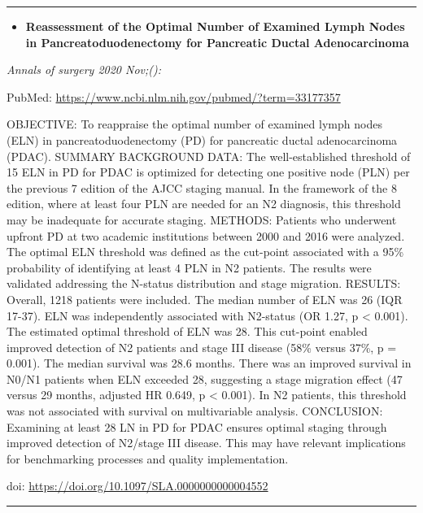 \documentclass[
]{article}
\providecommand{\tightlist}{%
  \setlength{\itemsep}{0pt}\setlength{\parskip}{0pt}}
\begin{document}
\begin{center}\rule{0.5\linewidth}{0.5pt}\end{center}

\begin{itemize}
\tightlist
\item
  \textbf{Reassessment of the Optimal Number of Examined Lymph Nodes in
  Pancreatoduodenectomy for Pancreatic Ductal Adenocarcinoma}
\end{itemize}

\emph{Annals of surgery 2020 Nov;():}

PubMed: \url{https://www.ncbi.nlm.nih.gov/pubmed/?term=33177357}

OBJECTIVE: To reappraise the optimal number of examined lymph nodes
(ELN) in pancreatoduodenectomy (PD) for pancreatic ductal adenocarcinoma
(PDAC). SUMMARY BACKGROUND DATA: The well-established threshold of 15
ELN in PD for PDAC is optimized for detecting one positive node (PLN)
per the previous 7 edition of the AJCC staging manual. In the framework
of the 8 edition, where at least four PLN are needed for an N2
diagnosis, this threshold may be inadequate for accurate staging.
METHODS: Patients who underwent upfront PD at two academic institutions
between 2000 and 2016 were analyzed. The optimal ELN threshold was
defined as the cut-point associated with a 95\% probability of
identifying at least 4 PLN in N2 patients. The results were validated
addressing the N-status distribution and stage migration. RESULTS:
Overall, 1218 patients were included. The median number of ELN was 26
(IQR 17-37). ELN was independently associated with N2-status (OR 1.27, p
\textless{} 0.001). The estimated optimal threshold of ELN was 28. This
cut-point enabled improved detection of N2 patients and stage III
disease (58\% versus 37\%, p = 0.001). The median survival was 28.6
months. There was an improved survival in N0/N1 patients when ELN
exceeded 28, suggesting a stage migration effect (47 versus 29 months,
adjusted HR 0.649, p \textless{} 0.001). In N2 patients, this threshold
was not associated with survival on multivariable analysis. CONCLUSION:
Examining at least 28 LN in PD for PDAC ensures optimal staging through
improved detection of N2/stage III disease. This may have relevant
implications for benchmarking processes and quality implementation.

doi: \url{https://doi.org/10.1097/SLA.0000000000004552}

\begin{center}\rule{0.5\linewidth}{0.5pt}\end{center}
\end{document}
